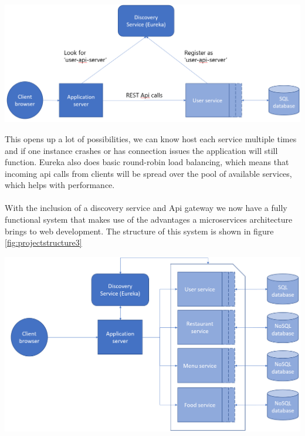 \documentclass[12pt]{article}
\newenvironment{Figure}
	{\par\medskip\noindent\minipage{\linewidth}}
	{\endminipage\par\medskip}
\begin{document}
\begin{multicols}{2}
\begin{Figure}
	\centering
	\includegraphics[width=\linewidth]{illustrations/discoverydesign.png}
	\label{fig:discovery}
\end{Figure}

\noindent This opens up a lot of possibilities, we can know host each service multiple times and if one instance crashes or has connection issues the application will still function. Eureka also does basic round-robin load balancing, which means that incoming api calls from clients will be spread over the pool of available services, which helps with performance.
\\\\
With the inclusion of a discovery service and Api gateway we now have a fully functional system that makes use of the advantages a microservices architecture brings to web development. The structure of this system is shown in figure \ref{fig:projectstructure3}

\begin{Figure}
	\centering
	\includegraphics[width=\linewidth]{illustrations/projectstructure3.png}
	\label{fig:projectstructure3}
\end{Figure}

\end{multicols}
\end{document}
